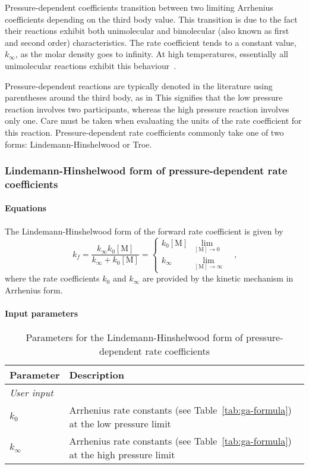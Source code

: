 Pressure-dependent coefficients transition
between two limiting Arrhenius coefficients depending on the third body value.
This transition is due to the fact their reactions exhibit
both unimolecular and bimolecular 
(also known as first and second order) characteristics.
The rate coefficient tends to a constant value, $k_\infty$,
as the molar density goes to infinity.
At high temperatures, essentially all unimolecular
reactions exhibit this behaviour~\cite{gilbert_etal_1983}. 

Pressure-dependent reactions are typically denoted in
the literature using parentheses around the third body, as in
This signifies that the low pressure reaction involves two participants,
whereas the high pressure reaction involves only one.
Care must be taken when evaluating the units of the rate coefficient
for this reaction.
Pressure-dependent rate coefficients commonly take one of two forms: Lindemann-Hinshelwood or Troe.

\subsubsection{Lindemann-Hinshelwood form of pressure-dependent rate coefficients}
\paragraph{Equations}
The Lindemann-Hinshelwood form of the forward rate coefficient is given by
\begin{equation}
k_f=\frac{k_\infty k_0[\text{M}]}{k_\infty + k_0[\text{M}]}=
 \begin{cases}
  k_0[\text{M}] &\lim_{[\text{M}]\to 0}\\
  k_\infty &\lim_{[\text{M}]\to \infty}
 \end{cases}\quad\text{,}
\end{equation}
where the rate coefficients $k_0$ and $k_\infty$ are provided
by the kinetic mechanism in Arrhenius form. 

\paragraph{Input parameters}
\begin{table}[h!]
\caption{Parameters for the Lindemann-Hinshelwood form of pressure-dependent rate coefficients}
\label{tab:lh-pd}
\begin{tabular}{lp{10cm}}
\toprule
Parameter & Description \\ \midrule
\multicolumn{2}{l}{\textit{User input}} \\
$k_0$       & Arrhenius rate constants (see Table~\ref{tab:ga-formula}) at the
              low pressure limit \\
$k_{\infty}$ & Arrhenius rate constants (see Table~\ref{tab:ga-formula}) at the
              high pressure limit \\
\bottomrule
\end{tabular}
\end{table}

